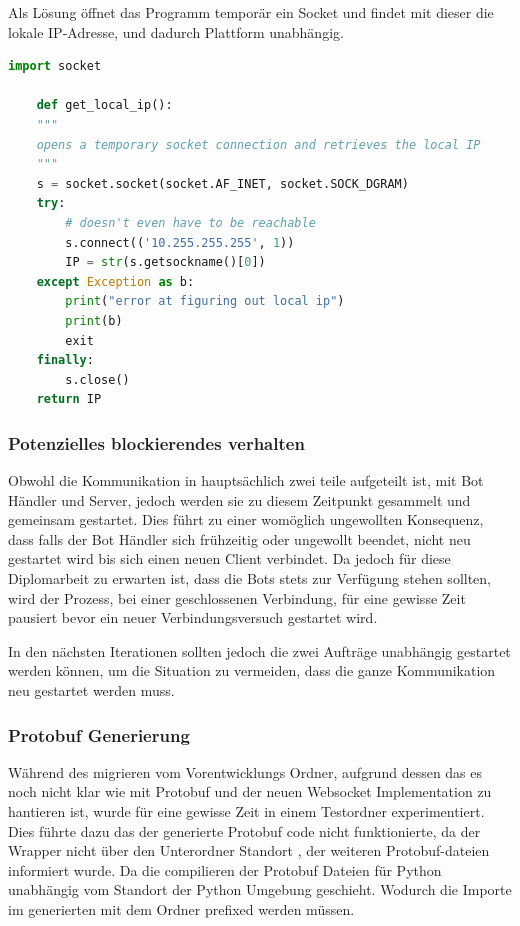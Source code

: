 Als Lösung öffnet das Programm temporär ein Socket 
und findet mit dieser die lokale IP-Adresse, und dadurch Plattform unabhängig.
\begin{lstlisting}[language=python, gobble=4]
    import socket

    def get_local_ip():
    """
    opens a temporary socket connection and retrieves the local IP
    """
    s = socket.socket(socket.AF_INET, socket.SOCK_DGRAM)
    try:
        # doesn't even have to be reachable
        s.connect(('10.255.255.255', 1))
        IP = str(s.getsockname()[0])
    except Exception as b:
        print("error at figuring out local ip")
        print(b)
        exit
    finally:
        s.close()
    return IP
\end{lstlisting}

\subsubsection{Potenzielles blockierendes verhalten}
Obwohl die Kommunikation in hauptsächlich zwei  teile aufgeteilt ist, mit 
Bot Händler und Server, 
jedoch werden sie zu diesem Zeitpunkt gesammelt und gemeinsam gestartet.
Dies führt zu einer womöglich ungewollten Konsequenz,
dass falls der Bot Händler sich frühzeitig oder ungewollt beendet, 
nicht neu gestartet wird bis sich einen neuen Client verbindet.
% 
Da jedoch für diese Diplomarbeit zu erwarten ist, 
dass die Bots stets zur Verfügung stehen sollten,
wird der Prozess, bei einer geschlossenen Verbindung,
für eine gewisse Zeit pausiert bevor ein neuer Verbindungsversuch gestartet wird.

In den nächsten Iterationen sollten jedoch 
die zwei Aufträge unabhängig gestartet werden können, 
um die Situation zu vermeiden, dass die ganze Kommunikation neu gestartet werden muss.

\subsubsection{Protobuf Generierung}
Während des migrieren vom Vorentwicklungs Ordner, 
aufgrund dessen das es noch nicht klar wie mit Protobuf 
und der neuen Websocket Implementation zu hantieren ist, 
wurde für eine gewisse Zeit in einem Testordner experimentiert.
Dies führte dazu das der generierte Protobuf code nicht funktionierte,
da der Wrapper nicht über den Unterordner Standort , 
der weiteren Protobuf-dateien informiert wurde.
Da die compilieren der Protobuf Dateien für Python unabhängig vom Standort
der Python Umgebung geschieht. 
Wodurch die Importe im generierten 
mit dem Ordner prefixed werden müssen.


